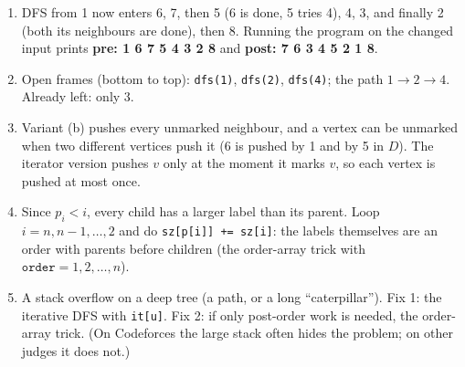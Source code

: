 \begin{solutionbox}[Answers]
\begin{enumerate}[leftmargin=*]
    \item DFS from 1 now enters 6, 7, then 5 (6 is done, 5 tries 4), 4, 3, and finally 2 (both its neighbours are done), then 8. Running the program on the changed input prints \textbf{pre: 1 6 7 5 4 3 2 8} and \textbf{post: 7 6 3 4 5 2 1 8}.
    \item Open frames (bottom to top): \texttt{dfs(1)}, \texttt{dfs(2)}, \texttt{dfs(4)}; the path $1 \to 2 \to 4$. Already left: only 3.
    \item Variant (b) pushes every unmarked neighbour, and a vertex can be unmarked when two different vertices push it (6 is pushed by 1 and by 5 in $D$). The iterator version pushes $v$ only at the moment it marks $v$, so each vertex is pushed at most once.
    \item Since $p_i < i$, every child has a larger label than its parent. Loop $i = n, n-1, \dots, 2$ and do \texttt{sz[p[i]] += sz[i]}: the labels themselves are an order with parents before children (the order-array trick with $\texttt{order} = 1,2,\dots,n$).
    \item A stack overflow on a deep tree (a path, or a long ``caterpillar''). Fix 1: the iterative DFS with \texttt{it[u]}. Fix 2: if only post-order work is needed, the order-array trick. (On Codeforces the large stack often hides the problem; on other judges it does not.)
\end{enumerate}
\end{solutionbox}
